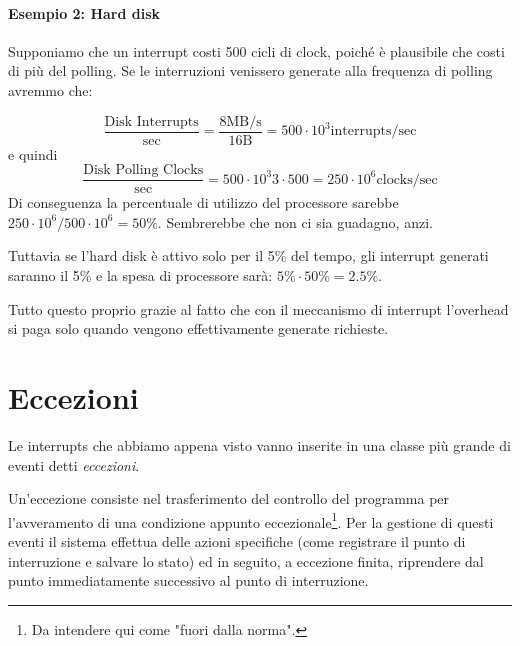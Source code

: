 \documentclass[class=book, crop=false, oneside]{standalone}
\begin{document}
\paragraph{Esempio 2: Hard disk} Supponiamo che un interrupt costi 500 cicli di clock, poiché è plausibile che costi di più del polling. Se le interruzioni venissero generate alla frequenza di polling avremmo che:

\begin{equation*}
	\frac{\textrm{Disk Interrupts}}{\textrm{sec}}=\frac{8 \textrm{MB/s}}{16\textrm{B}}=500\cdot 10^{3}\textrm{interrupts}/\textrm{sec}
\end{equation*}
e quindi
\begin{equation*}
	\frac{\textrm{Disk Polling Clocks}}{\textrm{sec}}=500\cdot 10^3{3}\cdot 500=250\cdot 10^6 \textrm{clocks}/\textrm{sec}
\end{equation*}
Di conseguenza la percentuale di utilizzo del processore sarebbe \(250\cdot 10^6/500\cdot 10^6= 50\%\). Sembrerebbe che non ci sia guadagno, anzi.

Tuttavia se l'hard disk è attivo solo per il 5\% del tempo, gli interrupt generati saranno il 5\% e la spesa di processore sarà: \(5\% \cdot 50\%=2.5\%\).

Tutto questo proprio grazie al fatto che con il meccanismo di interrupt l'overhead si paga solo quando vengono effettivamente generate richieste.

\section{Eccezioni}
Le interrupts che abbiamo appena visto vanno inserite in una classe più grande di eventi detti \emph{eccezioni}.

Un'eccezione consiste nel trasferimento del controllo del programma per l'avveramento di una condizione appunto eccezionale\footnote{Da intendere qui come "fuori dalla norma".}.
Per la gestione di questi eventi il sistema effettua delle azioni specifiche (come registrare il punto di interruzione e salvare lo stato) ed in seguito, a eccezione finita, riprendere dal punto immediatamente successivo al punto di interruzione.
\end{document}
